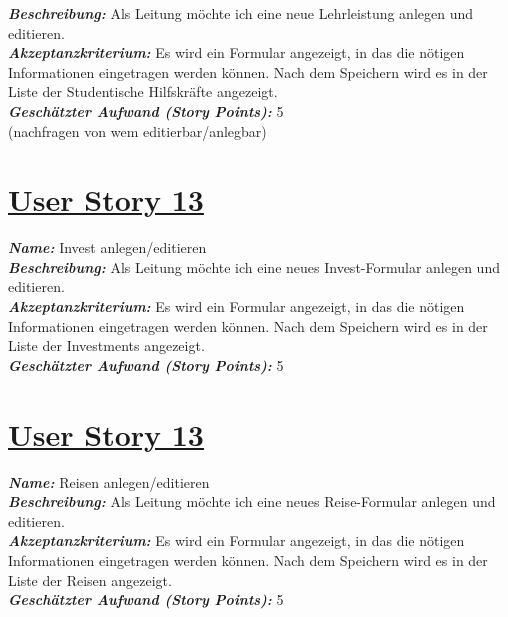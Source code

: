\documentclass[12pt]{article}%
\begin{document}
\textbf{\textit{Beschreibung:}} Als Leitung möchte ich eine neue Lehrleistung anlegen und editieren.
\\

\textbf{\textit{Akzeptanzkriterium:}} Es wird ein Formular angezeigt, in das die nötigen Informationen eingetragen werden können. Nach dem Speichern wird es in der Liste der Studentische Hilfskräfte angezeigt.
\\

\textbf{\textit{Geschätzter Aufwand (Story Points):}} 5
\\


(nachfragen von wem editierbar/anlegbar)
\section*{\large \underline{User Story 13}}
\textit{\textbf{Name:}} Invest anlegen/editieren
\\

\textbf{\textit{Beschreibung:}} Als Leitung möchte ich eine neues Invest-Formular anlegen und editieren.
\\

\textbf{\textit{Akzeptanzkriterium:}} Es wird ein Formular angezeigt, in das die nötigen Informationen eingetragen werden können. Nach dem Speichern wird es in der Liste der Investments angezeigt.
\\

\textbf{\textit{Geschätzter Aufwand (Story Points):}} 5
\\



\section*{\large \underline{User Story 13}}
\textit{\textbf{Name:}} Reisen anlegen/editieren
\\

\textbf{\textit{Beschreibung:}} Als Leitung möchte ich eine neues Reise-Formular anlegen und editieren.
\\

\textbf{\textit{Akzeptanzkriterium:}} Es wird ein Formular angezeigt, in das die nötigen Informationen eingetragen werden können. Nach dem Speichern wird es in der Liste der Reisen angezeigt.
\\

\textbf{\textit{Geschätzter Aufwand (Story Points):}} 5
\\
\end{document}

